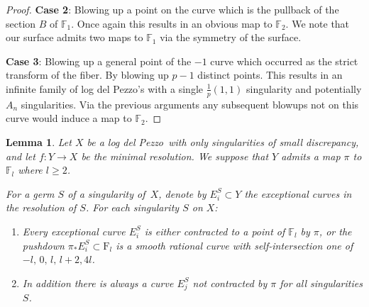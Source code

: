 \documentclass[11pt]{amsbook}
\theoremstyle{plain}
\newtheorem{lem}[thm]{Lemma}
\newcommand{\ldp}{log del Pezzo}
\newcommand{\mb}[1]{\mathbb{#1}}
\newcommand{\minres}{minimal resolution}
\newcommand{\F}{\mathrm{F}}
\begin{document}
\begin{proof}
\textbf{Case 2}: Blowing up a point on the curve which is the pullback of the section $B$ of $\mb{F}_1$. Once again this results in an obvious map to $\mb{F}_2$. We note that our surface admits two maps to $\mb{F}_1$ via the symmetry of the surface.


\textbf{Case 3}:
Blowing up a general point of the $-1 $ curve which occurred as the strict transform of the fiber. By blowing up $p-1$ distinct points. This results in an infinite family of \ldp's with a single $\frac{1}{p}(1,1)$ singularity and potentially $A_n$ singularities.
Via the previous arguments any subsequent blowups not on this curve would induce a map to $\mb{F}_2$.
\end{proof}


\begin{lem}\label{HSlem}
Let $X$ be a \ldp\ with only singularities of small discrepancy, and
let $f \colon Y \rightarrow X$ be the \minres. We suppose that $Y$ admits a map $\pi$ to $\mb{F}_l$ where $l \geq 2$.

For a germ $S$ of a singularity of~$X$, denote by
$E_i^S \subset Y$ the exceptional curves in the resolution of $S$.
For each singularity $S$ on $X$:
\begin{enumerate}
\item
Every exceptional curve $E_i^S$ is either contracted to a point of $\mb{F}_l$ by $\pi$,
or the pushdown
$\pi_* E_i^S\subset\F_l$ is a smooth rational curve with self-intersection one of $-l, \,0, \, l, \, l+2, 4l $.
\item
In addition there is always a curve $E_j^S$ not contracted by $\pi$ for all singularities $S$.
\end{enumerate}

\end{lem}
\end{document}
